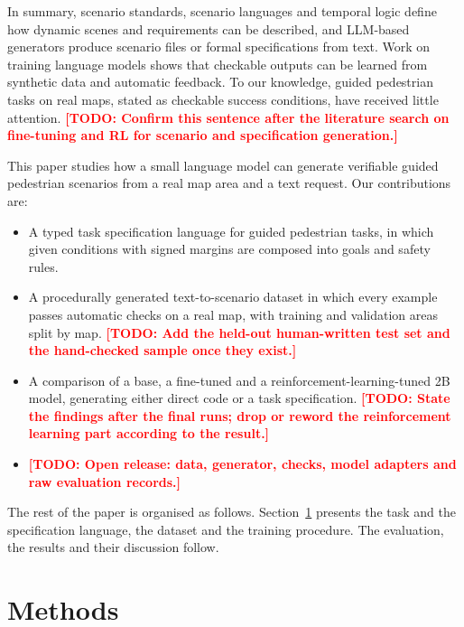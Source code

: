 \documentclass[preprint,12pt]{elsarticle}
\newcommand{\todo}[1]{\textcolor{red}{\textbf{[TODO: #1]}}}
\begin{document}
In summary, scenario standards, scenario languages and temporal logic define how dynamic scenes and requirements can be described, and LLM-based generators produce scenario files or formal specifications from text. Work on training language models shows that checkable outputs can be learned from synthetic data and automatic feedback. To our knowledge, guided pedestrian tasks on real maps, stated as checkable success conditions, have received little attention. \todo{Confirm this sentence after the literature search on fine-tuning and RL for scenario and specification generation.}

This paper studies how a small language model can generate verifiable guided pedestrian scenarios from a real map area and a text request. Our contributions are:
\begin{itemize}
  \item A typed task specification language for guided pedestrian tasks, in which given conditions with signed margins are composed into goals and safety rules.
  \item A procedurally generated text-to-scenario dataset in which every example passes automatic checks on a real map, with training and validation areas split by map. \todo{Add the held-out human-written test set and the hand-checked sample once they exist.}
  \item A comparison of a base, a fine-tuned and a reinforcement-learning-tuned 2B model, generating either direct code or a task specification. \todo{State the findings after the final runs; drop or reword the reinforcement learning part according to the result.}
  \item \todo{Open release: data, generator, checks, model adapters and raw evaluation records.}
\end{itemize}

The rest of the paper is organised as follows. Section~\ref{sec:methods} presents the task and the specification language, the dataset and the training procedure. The evaluation, the results and their discussion follow.

\section{Methods}
\label{sec:methods}
\end{document}
